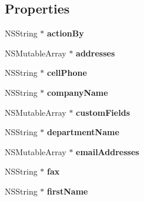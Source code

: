 \subsection*{Properties}
\begin{DoxyCompactItemize}
\item 
\hypertarget{interface_contact_ab307e3d6139d0b09af65dc4c0cd2551a}{N\-S\-String $\ast$ {\bfseries action\-By}}\label{interface_contact_ab307e3d6139d0b09af65dc4c0cd2551a}

\item 
\hypertarget{interface_contact_a6f3056ee37a2c574a33e3902ba3474ec}{N\-S\-Mutable\-Array $\ast$ {\bfseries addresses}}\label{interface_contact_a6f3056ee37a2c574a33e3902ba3474ec}

\item 
\hypertarget{interface_contact_aec563ebe90e8e4788ddb4f6acd78f751}{N\-S\-String $\ast$ {\bfseries cell\-Phone}}\label{interface_contact_aec563ebe90e8e4788ddb4f6acd78f751}

\item 
\hypertarget{interface_contact_a3fedaf7d7c99879b3c057e31953f2111}{N\-S\-String $\ast$ {\bfseries company\-Name}}\label{interface_contact_a3fedaf7d7c99879b3c057e31953f2111}

\item 
\hypertarget{interface_contact_afbd448e9768e6bd5aed50863552694a5}{N\-S\-Mutable\-Array $\ast$ {\bfseries custom\-Fields}}\label{interface_contact_afbd448e9768e6bd5aed50863552694a5}

\item 
\hypertarget{interface_contact_a527b59aba342102c47c4a3bb43605b36}{N\-S\-String $\ast$ {\bfseries department\-Name}}\label{interface_contact_a527b59aba342102c47c4a3bb43605b36}

\item 
\hypertarget{interface_contact_a334fd74963f3c92c2699f2241bb63070}{N\-S\-Mutable\-Array $\ast$ {\bfseries email\-Addresses}}\label{interface_contact_a334fd74963f3c92c2699f2241bb63070}

\item 
\hypertarget{interface_contact_acb90e8cf0e6ff5ea93ae8c712d24eda5}{N\-S\-String $\ast$ {\bfseries fax}}\label{interface_contact_acb90e8cf0e6ff5ea93ae8c712d24eda5}

\item 
\hypertarget{interface_contact_a8624b8683addad46447537e7646e7c7a}{N\-S\-String $\ast$ {\bfseries first\-Name}}\label{interface_contact_a8624b8683addad46447537e7646e7c7a}


\end{DoxyCompactItemize}
